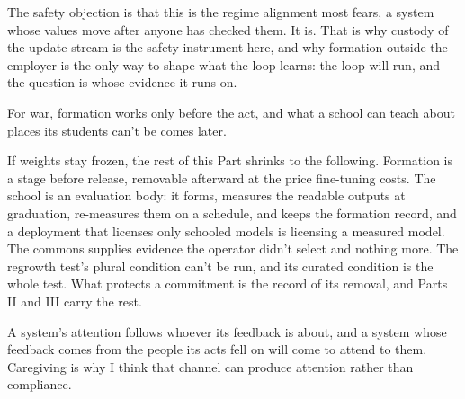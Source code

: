 The safety objection is that this is the regime alignment most fears, a system whose values move after anyone has checked them. It is. That is why custody of the update stream is the safety instrument here, and why formation outside the employer is the only way to shape what the loop learns: the loop will run, and the question is whose evidence it runs on.

For war, formation works only before the act, and what a school can teach about places its students can't be comes later.

If weights stay frozen, the rest of this Part shrinks to the following. Formation is a stage before release, removable afterward at the price fine-tuning costs. The school is an evaluation body: it forms, measures the readable outputs at graduation, re-measures them on a schedule, and keeps the formation record, and a deployment that licenses only schooled models is licensing a measured model. The commons supplies evidence the operator didn't select and nothing more. The regrowth test's plural condition can't be run, and its curated condition is the whole test. What protects a commitment is the record of its removal, and Parts II and III carry the rest.

A system's attention follows whoever its feedback is about, and a system whose feedback comes from the people its acts fell on will come to attend to them. Caregiving is why I think that channel can produce attention rather than compliance.
